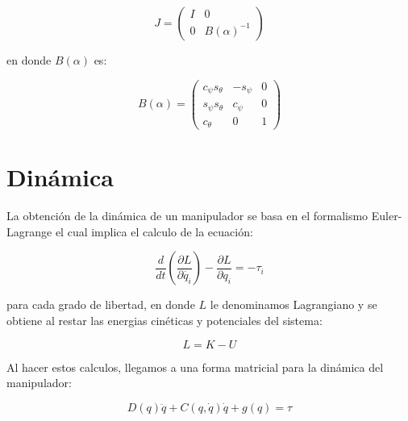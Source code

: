 \begin{multicols*}{3}
            \begin{equation}
                J =
                \begin{pmatrix}
                    I & 0 \\
                    0 & B(\alpha)^{-1}
                \end{pmatrix}
            \end{equation}

            en donde $B(\alpha)$ es:

            \begin{equation}
                B(\alpha) =
                \begin{pmatrix}
                    c_{\psi} s_{\theta} & -s_{\psi} & 0 \\
                    s_{\psi} s_{\theta} & c_{\psi} & 0 \\
                    c_{\theta} & 0 & 1
                \end{pmatrix}
            \end{equation}


    \section{Dinámica}

        La obtención de la dinámica de un manipulador se basa en el formalismo Euler-Lagrange el cual implica el calculo de la ecuación:

        \begin{equation}
            \frac{d}{dt} \left( \frac{\partial L}{\partial \dot{q_i}} \right) - \frac{\partial L}{\partial q_i} = - \tau_i
        \end{equation}

        para cada grado de libertad, en donde $L$ le denominamos Lagrangiano y se obtiene al restar las energias cinéticas y potenciales del sistema:

        \begin{equation}
            L = K - U
        \end{equation}

        Al hacer estos calculos, llegamos a una forma matricial para la dinámica del manipulador:

        \begin{equation}
            D(q) \ddot{q} + C(q, \dot{q}) \dot{q} + g(q) = \tau
        \end{equation}


\end{multicols*}
